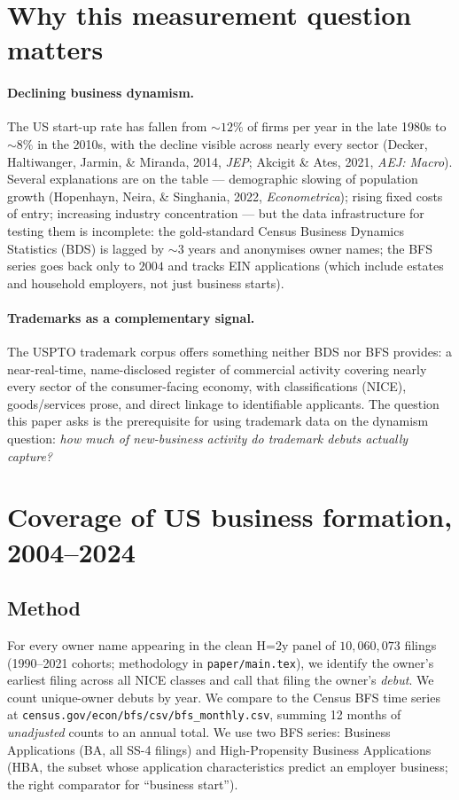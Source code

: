 \documentclass[11pt]{article}
\begin{document}
\section{Why this measurement question matters}

\paragraph{Declining business dynamism.} The US start-up rate has
fallen from $\sim 12\%$ of firms per year in the late 1980s to
$\sim 8\%$ in the 2010s, with the decline visible across nearly every
sector (Decker, Haltiwanger, Jarmin, \& Miranda, 2014, \emph{JEP};
Akcigit \& Ates, 2021, \emph{AEJ: Macro}). Several explanations are on
the table --- demographic slowing of population growth (Hopenhayn,
Neira, \& Singhania, 2022, \emph{Econometrica}); rising fixed costs of
entry; increasing industry concentration --- but the data
infrastructure for testing them is incomplete: the gold-standard
Census Business Dynamics Statistics (BDS) is lagged by $\sim 3$ years
and anonymises owner names; the BFS series goes back only to $2004$
and tracks EIN applications (which include estates and household
employers, not just business starts).

\paragraph{Trademarks as a complementary signal.} The USPTO trademark
corpus offers something neither BDS nor BFS provides: a near-real-time,
name-disclosed register of commercial activity covering nearly every
sector of the consumer-facing economy, with classifications (NICE),
goods/services prose, and direct linkage to identifiable applicants.
The question this paper asks is the prerequisite for using trademark
data on the dynamism question: \emph{how much of new-business activity
do trademark debuts actually capture?}

\section{Coverage of US business formation, 2004--2024}

\subsection*{Method}
For every owner name appearing in the clean H=2y panel of
$10{,}060{,}073$ filings (1990--2021 cohorts; methodology in
\texttt{paper/main.tex}), we identify the owner's earliest filing
across all NICE classes and call that filing the owner's
\emph{debut}. We count unique-owner debuts by year. We compare to the
Census BFS time series at
\texttt{census.gov/econ/bfs/csv/bfs\_monthly.csv}, summing 12 months
of \emph{unadjusted} counts to an annual total. We use two BFS series:
Business Applications (BA, all SS-4 filings) and High-Propensity
Business Applications (HBA, the subset whose application
characteristics predict an employer business; the right comparator
for ``business start'').
\end{document}
